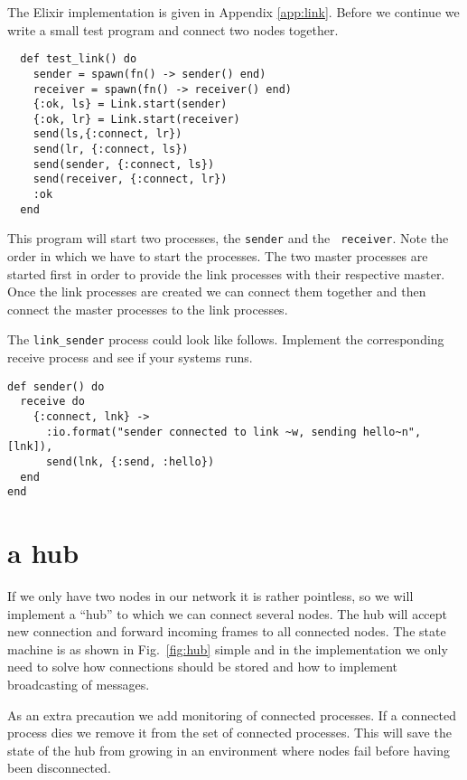 \documentclass[a4paper,11pt]{article}
\begin{document}
The Elixir implementation is given in Appendix \ref{app:link}. Before
we continue we write a small test program and connect two nodes
together.

\begin{lstlisting}
  def test_link() do
    sender = spawn(fn() -> sender() end)
    receiver = spawn(fn() -> receiver() end)
    {:ok, ls} = Link.start(sender)
    {:ok, lr} = Link.start(receiver)
    send(ls,{:connect, lr})
    send(lr, {:connect, ls})
    send(sender, {:connect, ls})
    send(receiver, {:connect, lr})
    :ok
  end
\end{lstlisting}  

This program will start two processes, the {\tt sender} and the {\tt
  receiver}.  Note the order in which we have to start the
processes. The two master processes are started first in order to
provide the link processes with their respective master. Once the link
processes are created we can connect them together and then connect
the master processes to the link processes.

The {\tt link\_sender} process could look like follows. Implement the
corresponding receive process and see if your systems runs.


\begin{lstlisting}
def sender() do
  receive do
    {:connect, lnk} ->
      :io.format("sender connected to link ~w, sending hello~n", [lnk]),
      send(lnk, {:send, :hello})
  end
end            
\end{lstlisting}

\section{a hub}

If we only have two nodes in our network it is rather pointless, so we
will implement a ``hub'' to which we can connect several nodes. The hub
will accept new connection and forward incoming frames to all
connected nodes. The state machine is as shown in Fig.~\ref{fig:hub}
simple and in the implementation we only need to solve how connections
should be stored and how to implement broadcasting of messages.

As an extra precaution we add monitoring of connected processes. If a
connected process dies we remove it from the set of connected
processes. This will save the state of the hub from growing in an
environment where nodes fail before having been disconnected.
\end{document}
